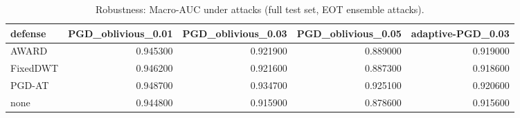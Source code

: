\begin{table}[htbp]\centering\caption{Robustness: Macro-AUC under attacks (full test set, EOT ensemble attacks).}\label{tab:robust}
\begin{tabular}{lrrrr}
\toprule
defense & PGD_oblivious_0.01 & PGD_oblivious_0.03 & PGD_oblivious_0.05 & adaptive-PGD_0.03 \\
\midrule
AWARD & 0.945300 & 0.921900 & 0.889000 & 0.919000 \\
FixedDWT & 0.946200 & 0.921600 & 0.887300 & 0.918600 \\
PGD-AT & 0.948700 & 0.934700 & 0.925100 & 0.920600 \\
none & 0.944800 & 0.915900 & 0.878600 & 0.915600 \\
\bottomrule
\end{tabular}
\end{table}
